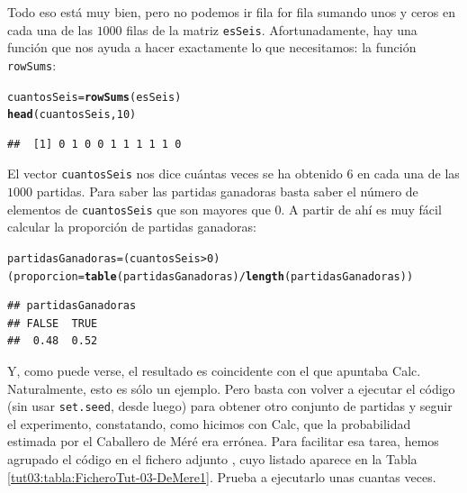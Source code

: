 \documentclass[10pt,a4paper]{article}\usepackage[]{graphicx}\usepackage[]{color}
\makeatletter
\newcommand{\hlnum}[1]{\textcolor[rgb]{0.686,0.059,0.569}{#1}}%
\newcommand{\hlopt}[1]{\textcolor[rgb]{0,0,0}{#1}}%
\newcommand{\hlstd}[1]{\textcolor[rgb]{0.345,0.345,0.345}{#1}}%
\newcommand{\hlkwb}[1]{\textcolor[rgb]{0.69,0.353,0.396}{#1}}%
\newcommand{\hlkwd}[1]{\textcolor[rgb]{0.737,0.353,0.396}{\textbf{#1}}}%
\newenvironment{kframe}{%
 \def\at@end@of@kframe{}%
 \ifinner\ifhmode%
  \def\at@end@of@kframe{\end{minipage}}%
  \begin{minipage}{\columnwidth}%
 \fi\fi%
 \def\FrameCommand##1{\hskip\@totalleftmargin \hskip-\fboxsep
 \colorbox{shadecolor}{##1}\hskip-\fboxsep
     \hskip-\linewidth \hskip-\@totalleftmargin \hskip\columnwidth}%
 \MakeFramed {\advance\hsize-\width
   \@totalleftmargin\z@ \linewidth\hsize
   \@setminipage}}%
 {\par\unskip\endMakeFramed%
 \at@end@of@kframe}
\newenvironment{knitrout}{}{} %
\makeatother
\begin{document}
Todo eso está muy bien, pero no podemos ir fila for fila sumando unos y ceros en cada una de las $1000$ filas de la matriz {\tt esSeis}. Afortunadamente, hay una función que nos ayuda a hacer exactamente lo que necesitamos: la función {\tt rowSums}:
\begin{knitrout}
\color{fgcolor}\begin{kframe}
\begin{alltt}
\hlstd{cuantosSeis} \hlkwb{=} \hlkwd{rowSums}\hlstd{(esSeis)}
\hlkwd{head}\hlstd{(cuantosSeis,} \hlnum{10}\hlstd{)}
\end{alltt}
\begin{verbatim}
##  [1] 0 1 0 0 1 1 1 1 1 0
\end{verbatim}
\end{kframe}
\end{knitrout}
El vector {\tt cuantosSeis} nos dice cuántas veces se ha obtenido $6$ en cada una de las $1000$ partidas. Para saber las partidas ganadoras basta saber el número de elementos de {\tt cuantosSeis} que son mayores que $0$.  A partir de ahí es muy fácil calcular la proporción de partidas ganadoras:
\begin{knitrout}
\color{fgcolor}\begin{kframe}
\begin{alltt}
\hlstd{partidasGanadoras} \hlkwb{=} \hlstd{(cuantosSeis} \hlopt{>} \hlnum{0}\hlstd{)}
\hlstd{(proporcion} \hlkwb{=} \hlkwd{table}\hlstd{(partidasGanadoras)}\hlopt{/}\hlkwd{length}\hlstd{(partidasGanadoras))}
\end{alltt}
\begin{verbatim}
## partidasGanadoras
## FALSE  TRUE 
##  0.48  0.52
\end{verbatim}
\end{kframe}
\end{knitrout}
Y, como puede verse, el resultado es coincidente con el que apuntaba Calc. Naturalmente, esto es sólo un ejemplo. Pero basta con volver a ejecutar el código (sin usar {\tt set.seed}, desde luego) para obtener otro conjunto de partidas y seguir el  experimento, constatando, como hicimos con Calc, que la probabilidad estimada por el Caballero de Méré era errónea. Para facilitar esa tarea, hemos agrupado el código en el fichero adjunto , cuyo listado aparece en la Tabla \ref{tut03:tabla:FicheroTut-03-DeMere1}. Prueba a ejecutarlo unas cuantas veces.
\end{document}
